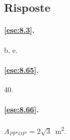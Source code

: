 
\subsection{Risposte}

\begingroup
\hypersetup{linkcolor=black}

\paragraph{\ref{ese:8.3}.}
b, e.

\paragraph{\ref{ese:8.65}.}
40.

\paragraph{\ref{ese:8.66}.}
$A_{PP''OP'}=2\sqrt{3}$~m\textsuperscript{2}.

\endgroup
